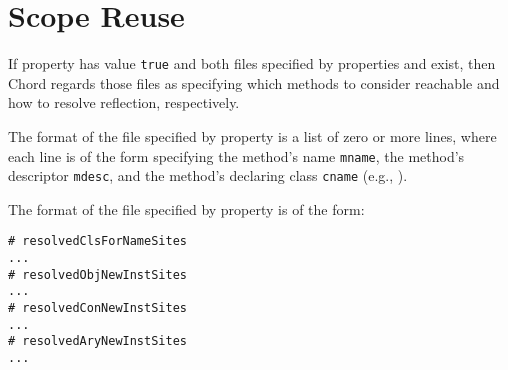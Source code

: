 %
%

\section{Scope Reuse}
\label{sec:scope-reuse}

If property  has value {\tt true} and both
files specified by properties  and
 exist, then Chord regards those files as
specifying which methods to consider reachable and how to resolve
reflection, respectively.

The format of the file specified by property 
is a list of zero or more lines, where each line is of the form
specifying the method's name {\tt mname}, the method's descriptor
{\tt mdesc}, and the method's declaring class {\tt cname} (e.g.,
\code{main:([Ljava/lang/String;)V@foo.bar.Main}).

The format of the file specified by property 
is of the form:

\begin{framed}
\begin{verbatim}
# resolvedClsForNameSites
...
# resolvedObjNewInstSites
...
# resolvedConNewInstSites
...
# resolvedAryNewInstSites
...
\end{verbatim}
\end{framed}

